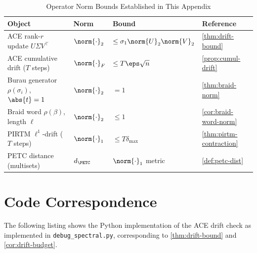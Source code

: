 \documentclass[12pt,letterpaper]{article}
\theoremstyle{definition}
\theoremstyle{remark}
\begin{document}
\renewcommand{\arraystretch}{1.3}
\begin{table}[ht]
\centering
\caption{Operator Norm Bounds Established in This Appendix}
\label{tab:bounds}
\begin{tabular}{@{}llll@{}}
\toprule
\textbf{Object} & \textbf{Norm} & \textbf{Bound} & \textbf{Reference} \\
\midrule
ACE rank-\(r\) update \(U\Sigma V^\top\)
  & \(\norm{\cdot}_2\)
  & \(\le \sigma_1 \norm{U}_2 \norm{V}_2\)
  & \cref{thm:drift-bound} \\
ACE cumulative drift (\(T\) steps)
  & \(\norm{\cdot}_F\)
  & \(\le T\eps\sqrt{n}\)
  & \cref{prop:cumul-drift} \\
Burau generator \(\rho(\sigma_i)\), \(\abs{t}=1\)
  & \(\norm{\cdot}_2\)
  & \(= 1\)
  & \cref{thm:braid-norm} \\
Braid word \(\rho(\beta)\), length \(\ell\)
  & \(\norm{\cdot}_2\)
  & \(\le 1\)
  & \cref{cor:braid-word-norm} \\
PIRTM \(\ell^1\)-drift (\(T\) steps)
  & \(\norm{\cdot}_1\)
  & \(\le T\delta_{\max}\)
  & \cref{thm:pirtm-contraction} \\
PETC distance (multisets)
  & \(d_{\PETC}\)
  & \(\norm{\cdot}_1\) metric
  & \cref{def:petc-dist} \\
\bottomrule
\end{tabular}
\end{table}

\section{Code Correspondence}
\label{sec:code}

The following listing shows the Python implementation of the ACE drift check
as implemented in \texttt{debug\_spectral.py}, corresponding to
\cref{thm:drift-bound} and \cref{cor:drift-budget}.
\end{document}
